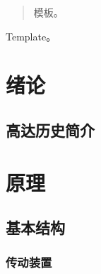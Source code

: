 \documentclass[
    Title = 123, %
    Grade = 17,
    StudentID = 17184xxx,
    StudentName = 张三,
    Department = 高达学院,
    Major = 驾驶学,
    Mentor = 李四,
    MentorTitle = 教授,
    SubmitDate = 2077年12月31日,
    Degree = 本科, %
]{njuthesis}
\begin{document}
\maketitle


\begin{abstract}
    模板。
\end{abstract}

\begin{englishabstract}
    Template。
  \end{englishabstract}

\mainmatter

\chapter{绪论}
    \section{高达历史简介}
\chapter{原理}
    \section{基本结构}
    \subsection{传动装置}
\end{document}
